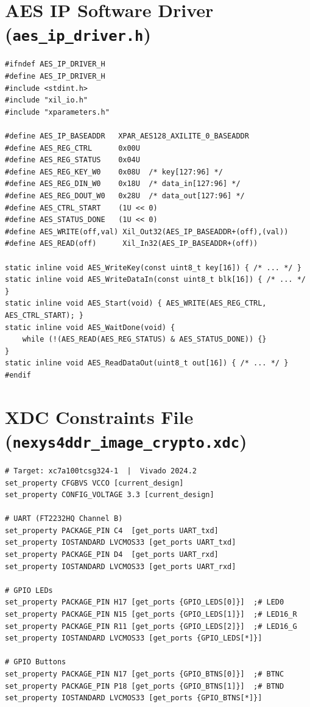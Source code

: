 \renewcommand{\thesection}{D}
\section{AES IP Software Driver (\texttt{aes\_ip\_driver.h})}
\label{app:driver}

\begin{lstlisting}[style=cstyle, caption={aes\_ip\_driver.h -- AXI-Lite C Driver API}]
#ifndef AES_IP_DRIVER_H
#define AES_IP_DRIVER_H
#include <stdint.h>
#include "xil_io.h"
#include "xparameters.h"

#define AES_IP_BASEADDR   XPAR_AES128_AXILITE_0_BASEADDR
#define AES_REG_CTRL      0x00U
#define AES_REG_STATUS    0x04U
#define AES_REG_KEY_W0    0x08U  /* key[127:96] */
#define AES_REG_DIN_W0    0x18U  /* data_in[127:96] */
#define AES_REG_DOUT_W0   0x28U  /* data_out[127:96] */
#define AES_CTRL_START    (1U << 0)
#define AES_STATUS_DONE   (1U << 0)
#define AES_WRITE(off,val) Xil_Out32(AES_IP_BASEADDR+(off),(val))
#define AES_READ(off)      Xil_In32(AES_IP_BASEADDR+(off))

static inline void AES_WriteKey(const uint8_t key[16]) { /* ... */ }
static inline void AES_WriteDataIn(const uint8_t blk[16]) { /* ... */ }
static inline void AES_Start(void) { AES_WRITE(AES_REG_CTRL, AES_CTRL_START); }
static inline void AES_WaitDone(void) {
    while (!(AES_READ(AES_REG_STATUS) & AES_STATUS_DONE)) {}
}
static inline void AES_ReadDataOut(uint8_t out[16]) { /* ... */ }
#endif
\end{lstlisting}

\renewcommand{\thesection}{E}
\section{XDC Constraints File (\texttt{nexys4ddr\_image\_crypto.xdc})}
\label{app:xdc}

\begin{lstlisting}[style=tclstyle, caption={nexys4ddr\_image\_crypto.xdc -- Physical Pin Constraints}]
# Target: xc7a100tcsg324-1  |  Vivado 2024.2
set_property CFGBVS VCCO [current_design]
set_property CONFIG_VOLTAGE 3.3 [current_design]

# UART (FT2232HQ Channel B)
set_property PACKAGE_PIN C4  [get_ports UART_txd]
set_property IOSTANDARD LVCMOS33 [get_ports UART_txd]
set_property PACKAGE_PIN D4  [get_ports UART_rxd]
set_property IOSTANDARD LVCMOS33 [get_ports UART_rxd]

# GPIO LEDs
set_property PACKAGE_PIN H17 [get_ports {GPIO_LEDS[0]}]  ;# LED0
set_property PACKAGE_PIN N15 [get_ports {GPIO_LEDS[1]}]  ;# LED16_R
set_property PACKAGE_PIN R11 [get_ports {GPIO_LEDS[2]}]  ;# LED16_G
set_property IOSTANDARD LVCMOS33 [get_ports {GPIO_LEDS[*]}]

# GPIO Buttons
set_property PACKAGE_PIN N17 [get_ports {GPIO_BTNS[0]}]  ;# BTNC
set_property PACKAGE_PIN P18 [get_ports {GPIO_BTNS[1]}]  ;# BTND
set_property IOSTANDARD LVCMOS33 [get_ports {GPIO_BTNS[*]}]
\end{lstlisting}


